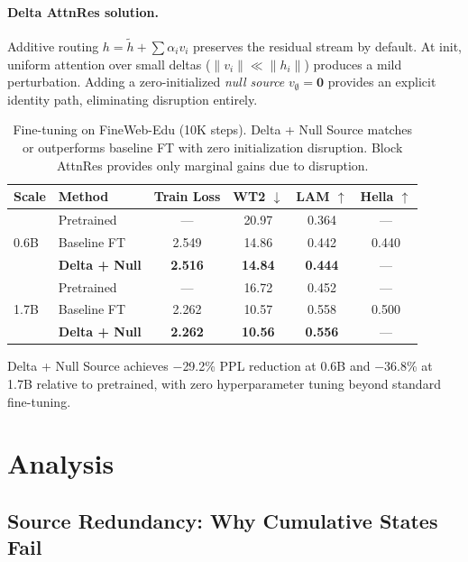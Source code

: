 \documentclass{article}
\begin{document}
\paragraph{Delta AttnRes solution.} Additive routing $h = \tilde{h} + \sum \alpha_i v_i$ preserves the residual stream by default. At init, uniform attention over small deltas ($\|v_i\| \ll \|h_i\|$) produces a mild perturbation. Adding a zero-initialized \emph{null source} $v_\emptyset = \mathbf{0}$ provides an explicit identity path, eliminating disruption entirely.

\begin{table}[h]
\centering
\caption{Fine-tuning on FineWeb-Edu (10K steps). Delta + Null Source matches or outperforms baseline FT with zero initialization disruption. Block AttnRes provides only marginal gains due to disruption.}
\label{tab:finetune}
\begin{tabular}{llcccc}
\toprule
\textbf{Scale} & \textbf{Method} & \textbf{Train Loss} & \textbf{WT2 $\downarrow$} & \textbf{LAM $\uparrow$} & \textbf{Hella $\uparrow$} \\
\midrule
\multirow{3}{*}{0.6B} & Pretrained & --- & 20.97 & 0.364 & --- \\
 & Baseline FT & 2.549 & 14.86 & 0.442 & 0.440 \\
 & \textbf{Delta + Null} & \textbf{2.516} & \textbf{14.84} & \textbf{0.444} & --- \\
\midrule
\multirow{3}{*}{1.7B} & Pretrained & --- & 16.72 & 0.452 & --- \\
 & Baseline FT & 2.262 & 10.57 & 0.558 & 0.500 \\
 & \textbf{Delta + Null} & \textbf{2.262} & \textbf{10.56} & \textbf{0.556} & --- \\
\bottomrule
\end{tabular}
\end{table}

Delta + Null Source achieves $-$29.2\% PPL reduction at 0.6B and $-$36.8\% at 1.7B relative to pretrained, with zero hyperparameter tuning beyond standard fine-tuning.

\section{Analysis}
\label{sec:analysis}

\subsection{Source Redundancy: Why Cumulative States Fail}
\label{sec:redundancy}
\end{document}
